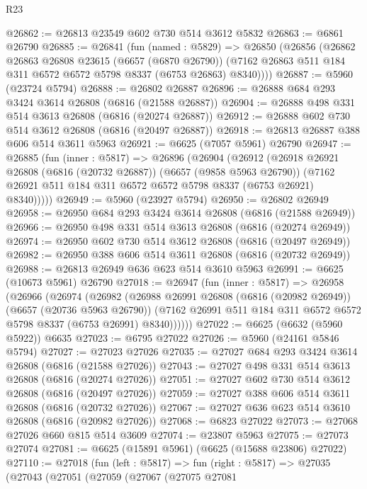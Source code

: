 \begin{lexlean}{R23}
\begin{coremodule}
@26862 := @26813 @23549 @602 @730 @514 @3612 @5832
@26863 := @6861 @26790
@26885 := @26841
    (fun (named : @5829) =>
    @26850
      (@26856
        (@26862
          @26863
          @26808
          @23615
          (@6657 (@6870 @26790))
          (@7162 @26863 @511 @184 @311 @6572 @6572 @5798 @8337 (@6753 @26863) @8340))))
@26887 := @5960 (@23724 @5794)
@26888 := @26802 @26887
@26896 := @26888 @684 @293 @3424 @3614 @26808 (@6816 (@21588 @26887))
@26904 := @26888 @498 @331 @514 @3613 @26808 (@6816 (@20274 @26887))
@26912 := @26888 @602 @730 @514 @3612 @26808 (@6816 (@20497 @26887))
@26918 := @26813 @26887 @388 @606 @514 @3611 @5963
@26921 := @6625 (@7057 @5961) @26790
@26947 := @26885
    (fun (inner : @5817) =>
    @26896
      (@26904
        (@26912
          (@26918
            @26921
            @26808
            (@6816 (@20732 @26887))
            (@6657 (@9858 @5963 @26790))
            (@7162 @26921 @511 @184 @311 @6572 @6572 @5798 @8337 (@6753 @26921) @8340)))))
@26949 := @5960 (@23927 @5794)
@26950 := @26802 @26949
@26958 := @26950 @684 @293 @3424 @3614 @26808 (@6816 (@21588 @26949))
@26966 := @26950 @498 @331 @514 @3613 @26808 (@6816 (@20274 @26949))
@26974 := @26950 @602 @730 @514 @3612 @26808 (@6816 (@20497 @26949))
@26982 := @26950 @388 @606 @514 @3611 @26808 (@6816 (@20732 @26949))
@26988 := @26813 @26949 @636 @623 @514 @3610 @5963
@26991 := @6625 (@10673 @5961) @26790
@27018 := @26947
    (fun (inner : @5817) =>
    @26958
      (@26966
        (@26974
          (@26982
            (@26988
              @26991
              @26808
              (@6816 (@20982 @26949))
              (@6657 (@20736 @5963 @26790))
              (@7162 @26991 @511 @184 @311 @6572 @6572 @5798 @8337 (@6753 @26991) @8340))))))
@27022 := @6625 (@6632 (@5960 @5922)) @6635
@27023 := @6795 @27022
@27026 := @5960 (@24161 @5846 @5794)
@27027 := @27023 @27026
@27035 := @27027 @684 @293 @3424 @3614 @26808 (@6816 (@21588 @27026))
@27043 := @27027 @498 @331 @514 @3613 @26808 (@6816 (@20274 @27026))
@27051 := @27027 @602 @730 @514 @3612 @26808 (@6816 (@20497 @27026))
@27059 := @27027 @388 @606 @514 @3611 @26808 (@6816 (@20732 @27026))
@27067 := @27027 @636 @623 @514 @3610 @26808 (@6816 (@20982 @27026))
@27068 := @6823 @27022
@27073 := @27068 @27026 @660 @815 @514 @3609
@27074 := @23807 @5963
@27075 := @27073 @27074
@27081 := @6625 (@15891 @5961) (@6625 (@15688 @23806) @27022)
@27110 := @27018
    (fun (left : @5817) =>
    fun (right : @5817) =>
    @27035
      (@27043
        (@27051
          (@27059
            (@27067
              (@27075
                @27081

\end{coremodule}
\end{lexlean}
